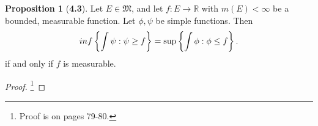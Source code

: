 \documentclass[12pt]{article}
\newcommand{\R}{\mathbb{R}}
\theoremstyle{definition}
\newtheorem*{prop}{Proposition}
\begin{document}
\begin{prop}[\textbf{4.3}]
    Let \( E \in \mathfrak{M} \), and let \( f: E \to \R \) with \( m(E) < \infty \) be a bounded, measurable function. Let \( \phi, \psi \) be simple functions. Then
        \[
            \\inf \left\{ \int \psi: \psi \geq f \right\} = \sup \left\{ \int \phi : \phi \leq f \right\}.  
        \] 
    if and only if \( f \) is measurable. 
        \begin{proof}\footnote{Proof is on pages 79-80.}
            
        \end{proof}
\end{prop}
\end{document}
